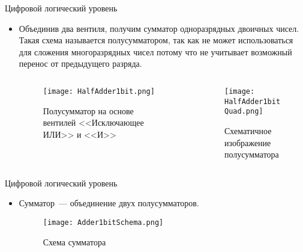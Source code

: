 \documentclass[aspectratio=169,14pt]{beamer}
\begin{document}
\begin{frame}{Цифровой логический уровень}
    \begin{itemize}
        \item Объединив два вентиля, получим сумматор одноразрядных двоичных чисел. Такая схема называется
        полусумматором, так как не может использоваться для сложения многоразрядных чисел потому
        что не учитывает возможный перенос от предыдущего разряда.
        \begin{columns}[T,onlytextwidth]
            \begin{column}{0.5\textwidth}
                \begin{figure}[htp]
                    \centering
                    \texttt{[image: HalfAdder1bit.png]}
                    \caption{\tiny{Полусумматор на основе вентилей <<Исключающее ИЛИ>> и <<И>> }}
                \end{figure}
            \end{column}
            \begin{column}{0.5\textwidth}
                \begin{figure}[htp]
                    \centering
                    \texttt{[image: HalfAdder1bitQuad.png]}
                    \caption{\tiny{Схематичное изображение полусумматора}}
                \end{figure}
            \end{column}
        \end{columns}
    \end{itemize}
\end{frame}

\begin{frame}{Цифровой логический уровень}
    \begin{itemize}
        \item Сумматор~--- объединение двух полусумматоров.
        \begin{figure}[htp]
            \centering
            \texttt{[image: Adder1bitSchema.png]}
            \caption{\tiny{Схема сумматора}}
        \end{figure}
    \end{itemize}
\end{frame}
\end{document}
